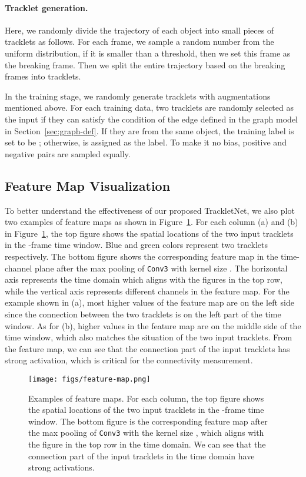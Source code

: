 \documentclass[10pt,twocolumn,letterpaper]{article}
\begin{document}
\paragraph{Tracklet generation.} Here, we randomly divide the trajectory of each object into small pieces of tracklets as follows. For each frame, we sample a random number from the uniform distribution, if it is smaller than a threshold, then we set this frame as the breaking frame. Then we split the entire trajectory based on the breaking frames into tracklets.


In the training stage, we randomly generate tracklets with augmentations mentioned above. For each training data, two tracklets are randomly selected as the input if they can satisfy the condition of the edge defined in the graph model in Section~\ref{sec:graph-def}. If they are from the same object, the training label is set to be ; otherwise,  is assigned as the label. To make it no bias, positive and negative pairs are sampled equally.






\subsection{Feature Map Visualization}

To better understand the effectiveness of our proposed TrackletNet, we also plot two examples of feature maps as shown in Figure~\ref{fig:feature-map}. For each column (a) and (b) in Figure~\ref{fig:feature-map}, the top figure shows the spatial locations of the two input tracklets in the -frame time window. Blue and green colors represent two tracklets respectively. The bottom figure shows the corresponding feature map in the time-channel plane after the max pooling of \texttt{Conv3} with kernel size . The horizontal axis represents the time domain which aligns with the figures in the top row, while the vertical axis represents different channels in the feature map. For the example shown in (a), most higher values of the feature map are on the left side since the connection between the two tracklets is on the left part of the time window. As for (b), higher values in the feature map are on the middle side of the time window, which also matches the situation of the two input tracklets. From the feature map, we can see that the connection part of the input tracklets has strong activation, which is critical for the connectivity measurement. 

\begin{figure}
\begin{center}
\texttt{[image: figs/feature-map.png]}
\end{center}
   \caption{Examples of feature maps. For each column, the top figure shows the spatial locations of the two input tracklets in the -frame time window. The bottom figure is the corresponding feature map after the max pooling of \texttt{Conv3} with the kernel size , which aligns with the figure in the top row in the time domain. We can see that the connection part of the input tracklets in the time domain have strong activations.
}
\label{fig:feature-map} 
\end{figure}
\end{document}
